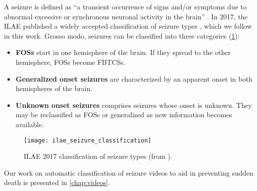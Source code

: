A seizure is defined as ``a transient occurrence of signs and/or symptoms due to abnormal excessive or synchronous neuronal activity in the brain'' \cite{fisher_epileptic_2005}.
In 2017, the \ac{ILAE} published a widely accepted classification of seizure types \cite{fisher_operational_2017}, which we follow in this work.
Grosso modo, seizures can be classified into three categories \cite{fisher_epileptic_2005} (\cref{fig:ilae_seizure_types}):
\begin{itemize}
  \item \textbf{\Acp{FOS}} start in one hemisphere of the brain. If they spread to the other hemisphere, \acp{FOS} become \acp{FBTCS}.
  \item \textbf{Generalized onset seizures} are characterized by an apparent onset in both hemispheres of the brain.
  \item \textbf{Unknown onset seizures} comprises seizures whose onset is unknown. They may be reclassified as \acp{FOS} or generalized as new information becomes available.
\end{itemize}

\begin{figure}
  \centering

  \texttt{[image: ilae\_seizure\_classification]}
  \caption[ILAE 2017 classification of seizure types]{
    ILAE 2017 classification of seizure types (from \cite{fisher_operational_2017}).
  }
  \label{fig:ilae_seizure_types}
\end{figure}

Our work on automatic classification of seizure videos to aid in preventing sudden death is presented in \cref{chap:videos}.
